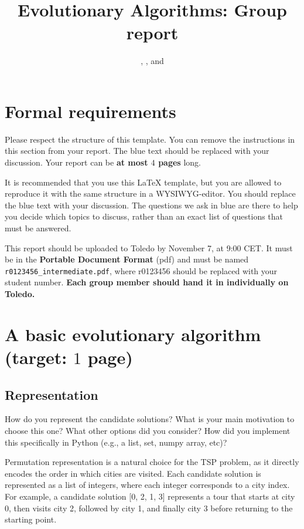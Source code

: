 \documentclass[a4paper,10pt]{article}
\title{\vspace{-2cm}Evolutionary Algorithms: Group report}
\author{\ReplaceMe{Group Member 1}, \ReplaceMe{Group Member 2}, and \ReplaceMe{Group Member 3}}
\newcommand{\thisyear}{\the\year}
\newcommand{\deadlineGroup}{November 7, \thisyear{} at 9:00 CET}
\newcommand{\ReplaceMe}[1]{{\color{blue}#1}}
\newcommand{\RemoveMe}[1]{{\color{purple}#1}}
\begin{document}
\selectfont{}

\maketitle

\RemoveMe{
\section*{Formal requirements}

Please respect the structure of this template. You can remove the instructions in this section from your report. The blue text should be replaced with your discussion. Your report can be \textbf{at most $4$ pages} long. 

It is recommended that you use this \LaTeX{} template, but you are allowed to reproduce it with the same structure in a WYSIWYG-editor. You should replace the blue text with your discussion. The questions we ask in blue are there to help you decide which topics to discuss, rather than an exact list of questions that must be answered.

This report should be uploaded to Toledo by \deadlineGroup. It must be in the \textbf{Portable Document Format} (pdf) and must be named \texttt{r0123456\_intermediate.pdf}, where r0123456 should be replaced with your student number. \textbf{Each group member should hand it in individually on Toledo.}
}

\section{A basic evolutionary algorithm \hfill(target: $1$ page)} 

\subsection{Representation}

\ReplaceMe{How do you represent the candidate solutions? What is your main motivation to choose this one? What other options did you consider? How did you implement this specifically in Python (e.g., a list, set, numpy array, etc)?}

Permutation representation is a natural choice for the TSP problem, as it directly encodes the order in which cities are visited. Each candidate solution is represented as a list of integers, where each integer corresponds to a city index. For example, a candidate solution [0, 2, 1, 3] represents a tour that starts at city 0, then visits city 2, followed by city 1, and finally city 3 before returning to the starting point.
\end{document}
